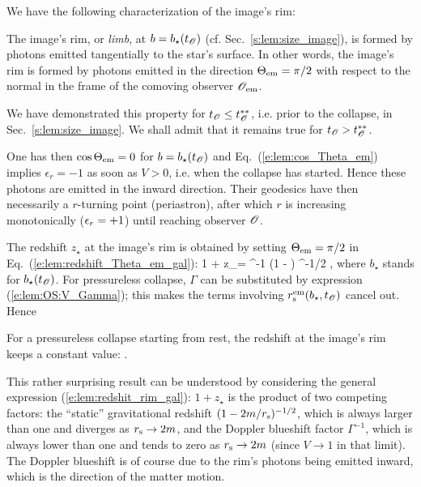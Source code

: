 We have the following characterization of the image's rim:
\begin{prop}
The image's rim, or \emph{limb}, at $b=b_\star(t_{\mathscr{O}})$ (cf. Sec.~\ref{s:lem:size_image}),
is formed by photons emitted tangentially to the
star's surface. In other words, the image's rim is formed by photons
emitted in the direction $\Theta_{\rm em} = \pi/2$ with respect to the normal
in the frame of the comoving observer $\mathscr{O}_{\rm em}$.
\end{prop}
We have demonstrated this property for $t_{\mathscr{O}} \leq t_{\mathscr{O}}^{**}$, i.e. prior to the collapse,
in Sec.~\ref{s:lem:size_image}. We shall admit that it remains true for
$t_{\mathscr{O}} > t_{\mathscr{O}}^{**}$.

One has then $\cos\Theta_{\rm em} = 0$ for $b=b_\star(t_{\mathscr{O}})$
and Eq.~(\ref{e:lem:cos_Theta_em}) implies $\epsilon_r = -1$ as soon as $V>0$, i.e. when
the collapse has started. Hence these photons are emitted in the inward direction.
Their geodesics have then necessarily a $r$-turning point (periastron), after which $r$
is increasing monotonically ($\epsilon_r = +1$) until reaching observer $\mathscr{O}$.

The redshift $z_\star$ at the image's rim is obtained by
setting $\Theta_{\rm em} = \pi/2$ in Eq.~(\ref{e:lem:redshift_Theta_em_gal}):
\be \label{e:lem:redshit_rim_gal}
    1 + z_\star = \Gamma^{-1}
    \left(1 - \right) ^{-1/2} ,
\ee
where $b_\star$ stands for $b_\star(t_{\mathscr{O}})$. For pressureless collapse,
$\Gamma$ can be substituted by expression (\ref{e:lem:OS:V_Gamma}); this
makes the terms involving $r_{\rm s}^{\rm em}(b_\star, t_{\mathscr{O}})$ cancel out.
Hence
\begin{prop}
For a pressureless collapse starting from rest,
the redshift at the image's rim keeps a constant value:
\be \label{e:lem:redhsit_rim_pless}
    .
\ee
\end{prop}
This rather surprising result can be understood by considering the general
expression (\ref{e:lem:redshit_rim_gal}): $1 + z_\star$ is the product
of two competing factors: the ``static'' gravitational redshift
$(1 - 2m/r_{\rm s})^{-1/2}$, which is always larger than one and diverges
as $r_{\rm s}\to 2m$, and the Doppler blueshift factor $\Gamma^{-1}$, which
is always lower than one and tends to zero as $r_{\rm s}\to 2m$ (since $V\to 1$
in that limit). The Doppler blueshift is of course due to the rim's photons being
emitted inward, which is the direction of the matter motion.

